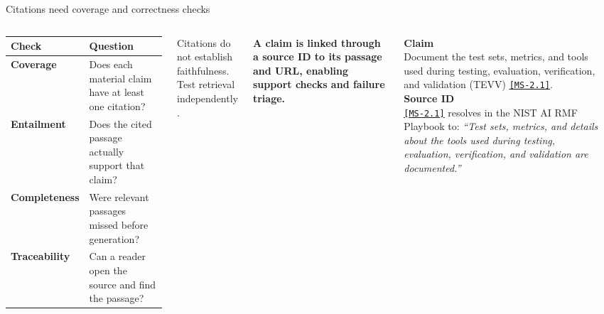 \documentclass[aspectratio=169]{beamer}
\begin{document}
\begin{frame}{Citations need coverage and correctness checks}
\small
\begin{columns}[c]
\begin{tabularx}{\linewidth}{>{\bfseries}lY}
\toprule
Check & Question \\\midrule
Coverage & Does each material claim have at least one citation?\\
Entailment & Does the cited passage actually support that claim?\\
Completeness & Were relevant passages missed before generation?\\
Traceability & Can a reader open the source and find the passage?\\
\bottomrule
\end{tabularx}
\vspace{.55em}
{\scriptsize\raggedright Citations do not establish faithfulness.\\
Test retrieval independently \parencite{Lewis2020RAG}.\par}
\raggedright
{\footnotesize\bfseries A claim is linked through a source ID to its passage and URL, enabling support checks and failure triage.\par}
\vspace{.8em}
\scriptsize
\colorbox{yellow!25}{\textbf{Claim}}\\[.25em]
Document the test sets, metrics, and tools used during testing, evaluation, verification, and validation (TEVV) \href{https://airc.nist.gov/airmf-resources/playbook/measure/}{\textcolor{brand}{\underline{\texttt{[MS-2.1]}}}}.\\[.85em]
\colorbox{green!25}{\textbf{Source ID}}\\[.25em]
\href{https://airc.nist.gov/airmf-resources/playbook/measure/}{\textcolor{brand}{\underline{\texttt{[MS-2.1]}}}} resolves in the NIST AI RMF Playbook to: \textit{“Test sets, metrics, and details about the tools used during testing, evaluation, verification, and validation are documented.”}
\vspace{.55em}
\begin{center}
\end{center}
\end{columns}
\end{frame}
\end{document}

